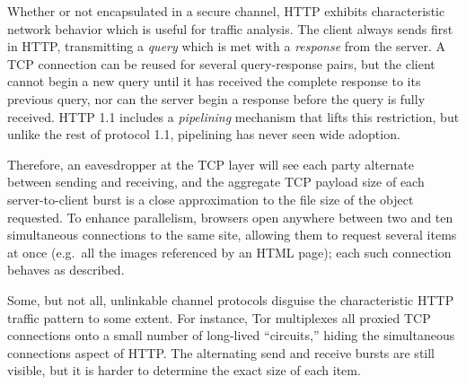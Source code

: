 Whether or not encapsulated in a secure channel, HTTP exhibits
characteristic network behavior which is useful for traffic analysis.
The client always sends first in HTTP, transmitting a \emph{query}
which is met with a \emph{response} from the server.  A TCP connection
can be reused for several query-response pairs, but the client cannot
begin a new query until it has received the complete response to its
previous query, nor can the server begin a response before the query
is fully received.  HTTP 1.1 includes a \emph{pipelining} mechanism
that lifts this restriction, but unlike the rest of protocol 1.1,
pipelining has never seen wide adoption.

Therefore, an eavesdropper at the TCP layer will see each party
alternate between sending and receiving, and the aggregate TCP payload
size of each server-to-client burst is a close approximation to the
file size of the object requested.  To enhance parallelism, browsers
open anywhere between two and ten simultaneous connections to the same
site, allowing them to request several items at once (e.g.\ all the
images referenced by an HTML page); each such connection behaves as
described.

Some, but not all, unlinkable channel protocols disguise the
characteristic HTTP traffic pattern to some extent.  For instance, Tor
multiplexes all proxied TCP connections onto a small number of
long-lived “circuits,” hiding the simultaneous connections aspect of
HTTP.  The alternating send and receive bursts are still visible, but
it is harder to determine the exact size of each item.




